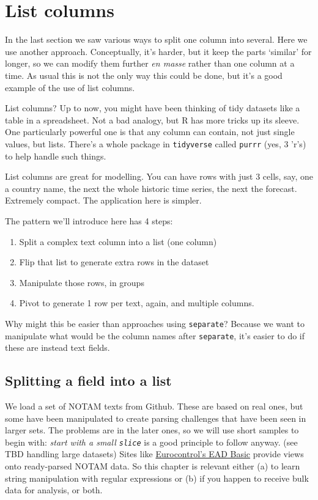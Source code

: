 \documentclass[
]{book}
\providecommand{\tightlist}{%
  \setlength{\itemsep}{0pt}\setlength{\parskip}{0pt}}
\begin{document}
\hypertarget{listcolumns}{%
\section{List columns}\label{listcolumns}}

In the last section we saw various ways to split one column into several. Here we use another approach. Conceptually, it's harder, but it keep the parts `similar' for longer, so we can modify them further \emph{en masse} rather than one column at a time. As usual this is not the only way this could be done, but it's a good example of the use of list columns.

List columns? Up to now, you might have been thinking of tidy datasets like a table in a spreadsheet. Not a bad analogy, but R has more tricks up its sleeve. One particularly powerful one is that any column can contain, not just single values, but lists. There's a whole package in \texttt{tidyverse} called \texttt{purrr} (yes, 3 'r's) to help handle such things.

List columns are great for modelling. You can have rows with just 3 cells, say, one a country name, the next the whole historic time series, the next the forecast. Extremely compact. The application here is simpler.

The pattern we'll introduce here has 4 steps:

\begin{enumerate}
\def\labelenumi{\arabic{enumi})}
\tightlist
\item
  Split a complex text column into a list (one column)
\item
  Flip that list to generate extra rows in the dataset
\item
  Manipulate those rows, in groups
\item
  Pivot to generate 1 row per text, again, and multiple columns.
\end{enumerate}

Why might this be easier than approaches using \texttt{separate}? Because we want to manipulate what would be the column names after \texttt{separate}, it's easier to do if these are instead text fields.

\hypertarget{splitting-a-field-into-a-list}{%
\subsection{Splitting a field into a list}\label{splitting-a-field-into-a-list}}

We load a set of NOTAM texts from Github. These are based on real ones, but some have been manipulated to create parsing challenges that have been seen in larger sets. The problems are in the later ones, so we will use short samples to begin with: \emph{start with a small \texttt{slice}} is a good principle to follow anyway. (see TBD handling large datasets) Sites like \href{https://www.ead.eurocontrol.int/cms-eadbasic/opencms/en/login/ead-basic/}{Eurocontrol's EAD Basic} provide views onto ready-parsed NOTAM data. So this chapter is relevant either (a) to learn string manipulation with regular expressions or (b) if you happen to receive bulk data for analysis, or both.
\end{document}
